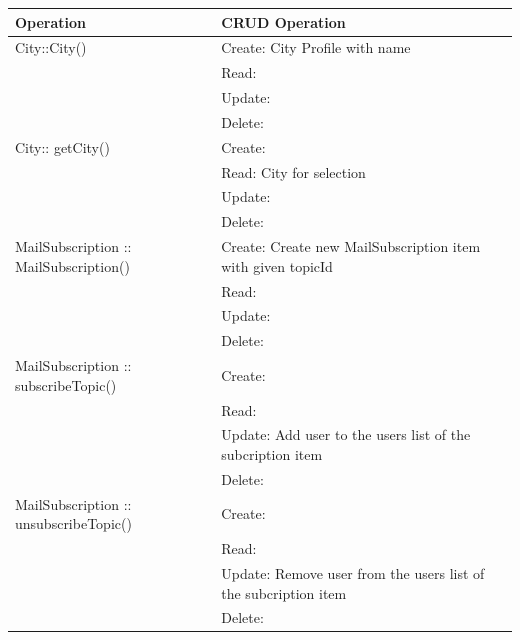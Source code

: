 \begin{longtable}{|p{.3\linewidth}|p{.7\linewidth}|}
    \hline
    Operation & CRUD Operation \\ \hline
    City::City() & Create: City Profile with name \\
               & Read: \\
               & Update: \\
               & Delete: \\ \hline
    City:: getCity() & Create: \\
                     & Read: City for selection \\
                     & Update: \\
                     & Delete: \\ \hline
    





    MailSubscription :: MailSubscription() & Create: Create new MailSubscription item with given topicId \\
                                         & Read: \\
                                         & Update: \\
                                         & Delete: \\ \hline
    MailSubscription :: subscribeTopic() & Create: \\
                                       & Read: \\
                                       & Update: Add user to the users list of the subcription item \\
                                       & Delete: \\ \hline
    MailSubscription :: unsubscribeTopic() & Create: \\
                                         & Read: \\
                                         & Update: Remove user from the users list of the subcription item \\
                                         & Delete: \\ \hline


\end{longtable}
